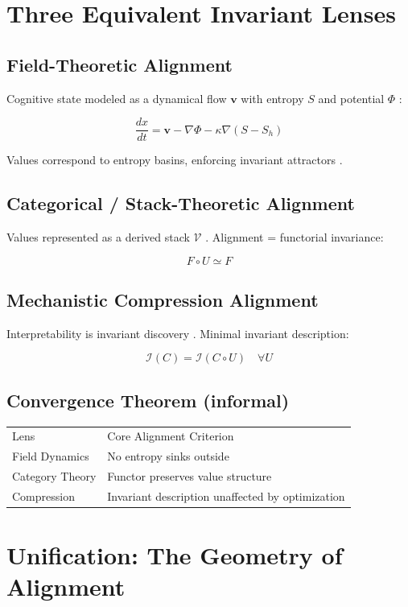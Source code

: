 \documentclass[11pt,a4paper]{article}
\theoremstyle{plain}
\begin{document}
\section{Three Equivalent Invariant Lenses}

\subsection{Field-Theoretic Alignment}
Cognitive state modeled as a dynamical flow $\mathbf{v}$ with entropy $S$ and potential $\Phi$ \cite{olah2020}:

\[
\frac{dx}{dt} = \mathbf{v} - \nabla\Phi - \kappa\nabla(S - S_h)
\]

Values correspond to entropy basins, enforcing invariant attractors \cite{olah2020}.

\subsection{Categorical / Stack-Theoretic Alignment}
Values represented as a derived stack $\mathcal{V}$ \cite{baez2011,lurie2009,schreiber2017}. Alignment = functorial invariance:

\[
F \circ U \simeq F
\]

\subsection{Mechanistic Compression Alignment}
Interpretability is invariant discovery \cite{weidinger2022,olah2020}. Minimal invariant description:

\[
\mathcal{I}(C) = \mathcal{I}(C \circ U) \quad \forall U
\]

\subsection{Convergence Theorem (informal)}
\begin{tabular}{l l}
Lens & Core Alignment Criterion \\
Field Dynamics & No entropy sinks outside \cite{olah2020} \\
Category Theory & Functor preserves value structure \cite{baez2011,lurie2009} \\
Compression & Invariant description unaffected by optimization \cite{weidinger2022} \\
\end{tabular}

\section{Unification: The Geometry of Alignment}
\end{document}
